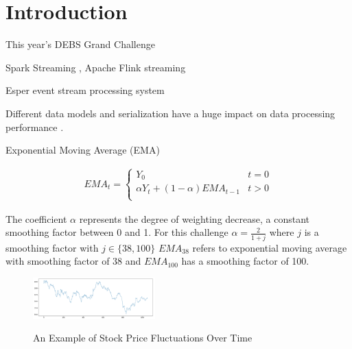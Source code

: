 
\section{Introduction}


This year's DEBS Grand Challenge \cite{debs2022challenge}









Spark Streaming \cite{zaharia2010spark}, Apache Flink streaming \cite{alexandrov2014stratosphere}

Esper event stream processing system \cite{Bernhardt2007}


Different data models and serialization have a huge impact on data processing performance \cite{DBLP:conf/cloud/SikdarTJ17}. 



Exponential Moving Average (EMA)

\begin{align*}
    EMA_t = \begin{cases} 
        Y_0 &  t = 0 \\ 
        \alpha Y_t + (1-\alpha) EMA_{t-1}& t>0 \\ 
        \end{cases}
\end{align*}

The coefficient $\alpha$ represents the degree of weighting decrease, a constant smoothing factor between 0 and 1.
For this challenge $\alpha = \frac{2}{1+j}$ where $j$ is a smoothing factor with $j \in \{38, 100 \}$
$EMA_{38}$ refers to exponential moving average with smoothing factor of 38 and  $EMA_{100}$ has a smoothing factor of 100. 

\begin{figure}[!ht]
    \begin{center}
        \includegraphics[width=0.42\textwidth]{./images/stock_example.png}
        \label{fig:stock}
        \caption{An Example of Stock Price Fluctuations Over Time}
    \end{center}
\end{figure}




